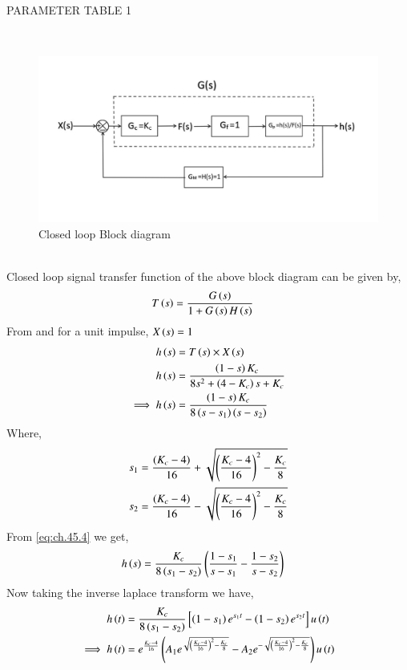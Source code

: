 \documentclass[journal,12pt,twocolumn]{IEEEtran}
\theoremstyle{remark}
\begin{document}
\begin{table}[ht]
    \centering
    
    \caption{PARAMETER TABLE 1}
    \label{tab:ch.45.1}
\end{table} \\
\begin{figure}[ht]
    \centering
    \includegraphics[width=\columnwidth]{figs/k.png}
    \caption{Closed loop Block diagram}
    \label{fig:ch.45.1}
\end{figure}    \\
Closed loop signal transfer function of the above block diagram can be given by,
\begin{align}
     T\left(s\right) &= \frac{G\left(s\right)}{1+G\left(s\right)H\left(s\right)}    
\end{align}
From  and 
for a unit impulse, $X\left(s\right)=1$ \\
\begin{align}
    h\left(s\right) &= T\left(s\right)\times X\left(s\right)   \\
    h\left(s\right) &= \frac{\left(1-s\right)K_c}{8s^2 + \left(4-K_c\right)s + K_c}  \\
    \implies h\left(s\right) &= \frac{\left(1-s\right)K_c}{8\left(s-s_1\right)\left(s-s_2\right)}  \label{eq:ch.45.4}
\end{align}
Where,
\begin{align}
    s_1 &= \frac{\left(K_c-4\right)}{16} + \sqrt{\left(\frac{K_c-4}{16}\right)^2 - \frac{K_c}{8}}  \\
    s_2 &= \frac{\left(K_c-4\right)}{16} - \sqrt{\left(\frac{K_c-4}{16}\right)^2 - \frac{K_c}{8}} 
\end{align}
From \eqref{eq:ch.45.4} we get,
\begin{align}
    h\left(s\right) &= \frac{K_c}{8\left(s_1-s_2\right)}\left(\frac{1-s_1}{s-s_1}-\frac{1-s_2}{s-s_2}\right)
\end{align}
Now taking the inverse laplace transform we have,
\begin{align}
    h\left(t\right) &= \frac{K_c}{8\left(s_1-s_2\right)} \left [\left(1-s_1\right)e^{s_1t}-\left(1-s_2\right)e^{s_2t} \right ]u\left(t\right)  \\
    \implies h\left(t\right) &= e^{\frac{K_c-4}{16}}\left(A_1e^{\sqrt{\left(\frac{K_c-4}{16}\right)^2 - \frac{K_c}{8}}} - A_2e^{-\sqrt{\left(\frac{K_c-4}{16}\right)^2 - \frac{K_c}{8}}}\right)u\left(t\right)    
\end{align}
\end{document}
